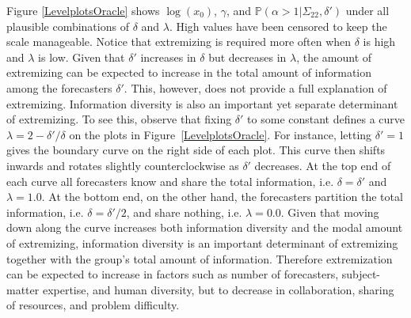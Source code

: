 \documentclass[11pt]{article}
\renewcommand{\P}{\mathbb{P}}
\newtheorem{observation}[theorem]{Observation}
\theoremstyle{definition}
\theoremstyle{definition}
\def\P{{\mathbb P}}
\begin{document}
Figure \ref{LevelplotsOracle} shows $\log(x_0)$, $\gamma$, and $\P(\alpha > 1 | \Sigma_{22}, \delta')$ under all plausible combinations of $\delta$ and $\lambda$. High values have been censored to keep the scale manageable. Notice that extremizing is required 
more often when $\delta$ is high and $\lambda$ is low.  Given that 
$\delta'$ increases in $\delta$ but decreases in $\lambda$, the amount 
of extremizing can be expected to increase in the total amount of 
information among the forecasters $\delta'$.  This, however, does not 
provide a full explanation of extremizing.  Information diversity 
is also an important yet separate determinant of extremizing.  
To see this, observe that fixing $\delta'$ to some constant 
defines a curve $\lambda = 2 - \delta'/\delta$ on the plots in 
Figure~\ref{LevelplotsOracle}.  For instance, letting $\delta' = 1$ 
gives the boundary curve on the right side of each plot.  This curve 
then shifts inwards and rotates slightly counterclockwise as 
$\delta'$ decreases.  At the top end of each curve all forecasters 
know and share the total information, i.e. $\delta = \delta'$ and 
$\lambda = 1.0$.  At the bottom end, on the other hand, the forecasters 
partition the total information, i.e. $\delta = \delta'/2$, and 
share nothing, i.e. $\lambda = 0.0$.  Given that moving down along 
the curve increases both information diversity and the modal amount 
of extremizing, information diversity is an important determinant 
of extremizing together with the group's total amount of information.  
Therefore extremization can be expected to increase in factors such as number of forecasters, subject-matter expertise, and human diversity, but to decrease in collaboration, sharing of resources, and problem difficulty.

\end{document}
